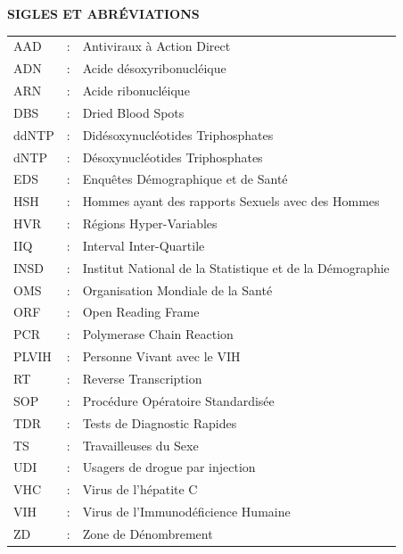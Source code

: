 \documentclass[a4paper,12pt]{article}
\begin{document}
\onehalfspacing
	
	\newpage
	\pagestyle{plain}
			
\cleardoublepage	
\tableofcontents
\thispagestyle{empty}
\cleardoublepage
{}
\setcounter{page}{1}

{}

\textbf{\huge SIGLES ET ABRÉVIATIONS}

\vspace{1.5cm}

\renewcommand{\arraystretch}{1.4}
\begin{tabular}{p{3cm} c p{10cm}}

AAD & : & Antiviraux à Action Direct \\ 
ADN & : & Acide désoxyribonucléique \\
ARN & : & Acide ribonucléique \\
DBS & : &  Dried Blood Spots \\
ddNTP & : & Didésoxynucléotides Triphosphates\\
dNTP & : & Désoxynucléotides Triphosphates\\
EDS & : & Enquêtes Démographique et de Santé \\
HSH & : & Hommes ayant des rapports Sexuels avec des Hommes\\
HVR& : & Régions Hyper-Variables \\
IIQ & : & Interval Inter-Quartile \\
INSD &: & Institut National de la Statistique et de la Démographie \\
OMS & : & Organisation Mondiale de la Santé \\
ORF & : & Open Reading Frame \\
PCR &: & Polymerase Chain Reaction \\
PLVIH & : & Personne Vivant avec le VIH \\
RT & : & Reverse Transcription \\
SOP & : &  Procédure Opératoire Standardisée \\
TDR & :  & Tests de Diagnostic Rapides \\
TS & : &   Travailleuses du Sexe \\
UDI & : & Usagers de drogue par injection \\
VHC & : & Virus de l’hépatite C \\
VIH & : & Virus de l'Immunodéficience Humaine \\
ZD & : & Zone de Dénombrement \\
 \end{tabular}
\end{document}
